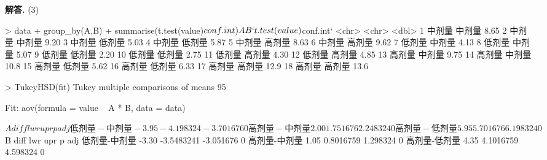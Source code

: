 \documentclass[12pt, a4paper, oneside]{ctexart}
\newenvironment{solution}[1][]{\par\noindent\textbf{#1解答. }}{\smallskip\par}  %
\begin{document}
\begin{solution}
    (3) \begin{rcode}
> data %
+     group_by(A,B) %
+     summarise(t.test(value)$conf.int)
   A      B      `t.test(value)$conf.int`
   <chr>  <chr>                     <dbl>
 1 中剂量 中剂量                     8.65
 2 中剂量 中剂量                     9.20
 3 中剂量 低剂量                     5.03
 4 中剂量 低剂量                     5.87
 5 中剂量 高剂量                     8.63
 6 中剂量 高剂量                     9.62
 7 低剂量 中剂量                     4.13
 8 低剂量 中剂量                     5.07
 9 低剂量 低剂量                     2.20
10 低剂量 低剂量                     2.75
11 低剂量 高剂量                     4.30
12 低剂量 高剂量                     4.85
13 高剂量 中剂量                     9.75
14 高剂量 中剂量                    10.8 
15 高剂量 低剂量                     5.62
16 高剂量 低剂量                     6.33
17 高剂量 高剂量                    12.9 
18 高剂量 高剂量                    13.6 

> TukeyHSD(fit)
Tukey multiple comparisons of means
    95%

Fit: aov(formula = value ~ A * B, data = data)

$A
                diff       lwr       upr p adj
低剂量-中剂量 -3.95 -4.198324 -3.701676     0
高剂量-中剂量  2.00  1.751676  2.248324     0
高剂量-低剂量  5.95  5.701676  6.198324     0

$B
                diff        lwr       upr p adj
低剂量-中剂量 -3.30 -3.5483241 -3.051676     0
高剂量-中剂量  1.05  0.8016759  1.298324     0
高剂量-低剂量  4.35  4.1016759  4.598324     0


\end{rcode}
\end{solution}
\end{document}
